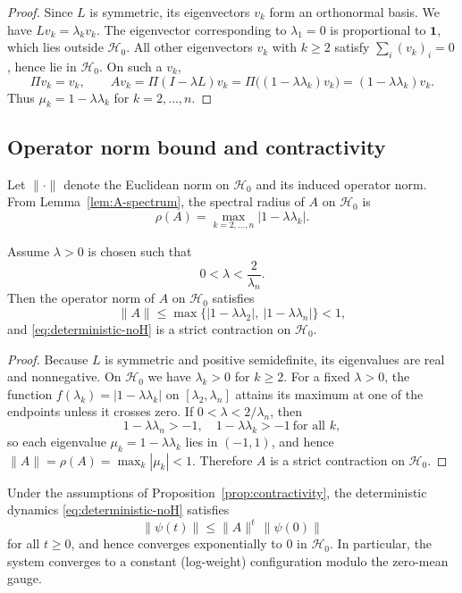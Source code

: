 \documentclass[11pt]{article}
\begin{document}
\begin{proof}
Since \(L\) is symmetric, its eigenvectors \(v_k\) form an orthonormal basis.
We have \(L v_k = \lambda_k v_k\). The eigenvector corresponding to
\(\lambda_1=0\) is proportional to \(\mathbf{1}\), which lies outside
\(\mathcal{H}_0\). All other eigenvectors \(v_k\) with \(k\ge 2\) satisfy
\(\sum_i (v_k)_i = 0\), hence lie in \(\mathcal{H}_0\). On such a
\(v_k\),
\[
\Pi v_k = v_k, \qquad
A v_k = \Pi(I - \lambda L) v_k
      = \Pi\bigl((1 - \lambda \lambda_k) v_k\bigr)
      = (1 - \lambda \lambda_k) v_k.
\]
Thus \(\mu_k = 1 - \lambda \lambda_k\) for \(k=2,\dots,n\).
\end{proof}

\subsection{Operator norm bound and contractivity}

Let \(\|\cdot\|\) denote the Euclidean norm on \(\mathcal{H}_0\) and its
induced operator norm. From Lemma~\ref{lem:A-spectrum}, the spectral radius
of \(A\) on \(\mathcal{H}_0\) is
\[
\rho(A) = \max_{k=2,\dots,n} |1 - \lambda \lambda_k|.
\]

\begin{proposition}
\label{prop:contractivity}
Assume \(\lambda>0\) is chosen such that
\[
0 < \lambda < \frac{2}{\lambda_n}.
\]
Then the operator norm of \(A\) on \(\mathcal{H}_0\) satisfies
\[
\|A\| \le \max\bigl\{|1 - \lambda\lambda_2|,\ |1 - \lambda\lambda_n|\bigr\} < 1,
\]
and \eqref{eq:deterministic-noH} is a strict contraction on
\(\mathcal{H}_0\).
\end{proposition}

\begin{proof}
Because \(L\) is symmetric and positive semidefinite, its eigenvalues
are real and nonnegative. On \(\mathcal{H}_0\) we have \(\lambda_k>0\)
for \(k\ge 2\). For a fixed \(\lambda>0\), the function
\(f(\lambda_k) = |1 - \lambda\lambda_k|\) on \([\lambda_2,\lambda_n]\)
attains its maximum at one of the endpoints unless it crosses zero.
If \(0<\lambda< 2/\lambda_n\), then
\[
1 - \lambda\lambda_n > -1,
\quad
1 - \lambda\lambda_k > -1\ \text{for all }k,
\]
so each eigenvalue \(\mu_k = 1 - \lambda\lambda_k\) lies in \((-1,1)\),
and hence \(\|A\| = \rho(A) = \max_k |\mu_k| < 1\). Therefore \(A\) is
a strict contraction on \(\mathcal{H}_0\).
\end{proof}

\begin{corollary}
\label{cor:exp-convergence}
Under the assumptions of Proposition~\ref{prop:contractivity}, the
deterministic dynamics \eqref{eq:deterministic-noH} satisfies
\[
\|\psi(t)\| \le \|A\|^t \,\|\psi(0)\|
\]
for all \(t\ge 0\), and hence converges exponentially to \(0\) in
\(\mathcal{H}_0\). In particular, the system converges to a constant
(log-weight) configuration modulo the zero-mean gauge.
\end{corollary}
\end{document}
